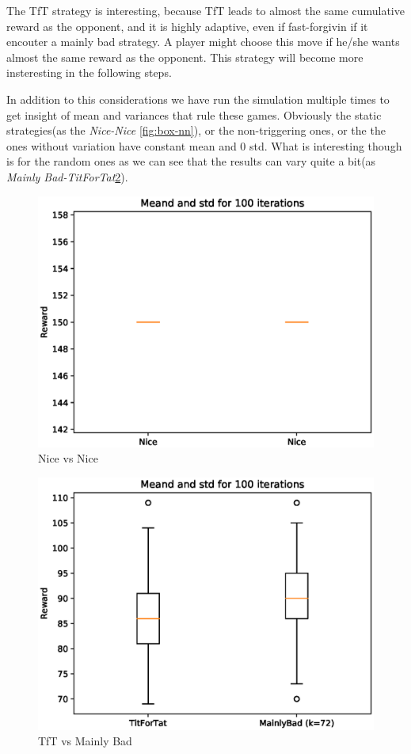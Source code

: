 \documentclass[journal,a4paper,10pt,twoside]{IEEEtran} %
\begin{document}
The TfT strategy is interesting, because TfT leads to almost the same cumulative reward as the opponent, and it is highly adaptive, even if fast-forgivin if it encouter a mainly bad strategy. 
A player might choose this move if he/she wants almost the same reward as the opponent. This strategy will become more insteresting in the following steps.


In addition to this considerations we have run the simulation multiple times to get insight of mean and variances that rule these games. Obviously the static strategies(as the \textit{Nice-Nice} \ref{fig:box-nn}), or the non-triggering ones, or the the ones without variation have constant mean and $0$ std. What is interesting though is for the random ones as we can see that the results can vary quite a bit(as \textit{Mainly Bad-TitForTat}\ref{fig:boxmbvtft}).

\begin{figure}[!ht]
    \centering
    \includegraphics[width=1\columnwidth]{../img/ipd2p/ipd2p-boxplot-Nice-Nice}
    \caption{Nice vs Nice}
    \label{fig:boxnn}
\end{figure}

\begin{figure}[!ht]
    \centering
    \includegraphics[width=1\columnwidth]{../img/ipd2p/ipd2p-boxplot-TitForTat-MainlyBad(k=72)}
    \caption{TfT vs Mainly Bad}
    \label{fig:boxmbvtft}
\end{figure}
\end{document}
